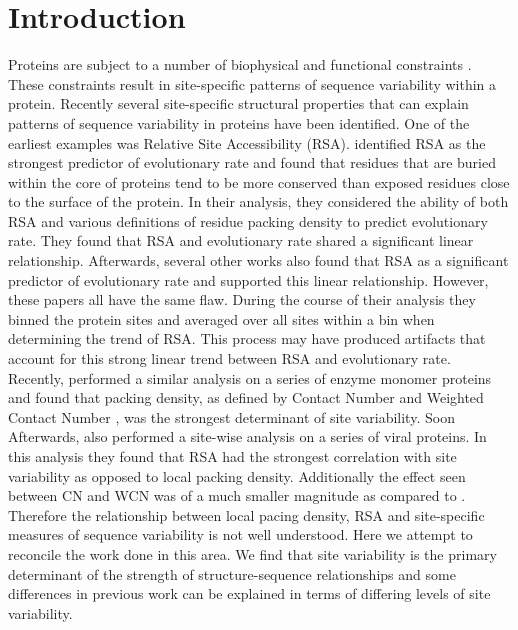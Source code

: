 \documentclass[12pt]{article}
\begin{document}
\section{Introduction}
\label{sec:intro}

Proteins are subject to a number of biophysical and functional constraints \citep{Scherreretal2012, Wilkeetal2010}. These constraints result in site-specific patterns of sequence variability within a protein. Recently several site-specific structural properties that can explain patterns of sequence variability in proteins have been identified. One of the earliest examples was Relative Site Accessibility (RSA). \cite{Fransozaetal2009} identified RSA as the strongest predictor of evolutionary rate and found that residues that are buried within the core of proteins tend to be more conserved than exposed residues close to the surface of the protein. In their analysis, they considered the ability of both RSA and various definitions of residue packing density to predict evolutionary rate. They found that RSA and evolutionary rate shared a significant linear relationship. Afterwards, several other works \citep{Ramseyetal2011, Scherreretal2012} also found that RSA as a significant predictor of evolutionary rate and supported this linear relationship. However, these papers all have the same flaw. During the course of their analysis they binned the protein sites and averaged over all sites within a bin when determining the trend of RSA. This process may have produced artifacts that account for this strong linear trend between RSA and evolutionary rate. \\
\indent Recently, \cite{Yehetal2014} performed a similar analysis on a series of enzyme monomer proteins and found that packing density, as defined by Contact Number and Weighted Contact Number \citep{Liaoetal2005, Yehetal2014, Huangetal2014}, was the strongest determinant of site variability.  Soon Afterwards, \cite{Shahmoradietal2014} also performed a site-wise analysis on a series of viral proteins. In this analysis they found that RSA had the strongest correlation with site variability as opposed to local packing density. Additionally the effect seen between CN and WCN was of a much smaller magnitude as compared to \cite{Yehetal2014}. Therefore the relationship between local pacing density, RSA and site-specific measures of sequence variability is not well understood. Here we attempt to reconcile the work done in this area. We find that site variability is the primary determinant of the strength of structure-sequence relationships and some differences in previous work can be explained in terms of differing levels of site variability. \\
\end{document}
